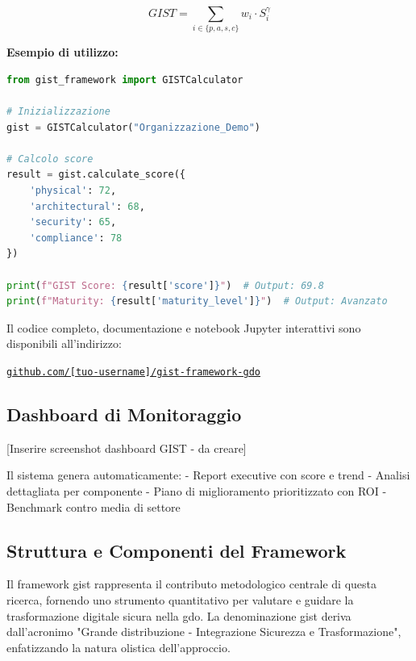 \begin{equation}
GIST = \sum_{i \in \{p,a,s,c\}} w_i \cdot S_i^{\gamma}
\end{equation}

\textbf{Esempio di utilizzo:}
\begin{lstlisting}[language=Python]
from gist_framework import GISTCalculator

# Inizializzazione
gist = GISTCalculator("Organizzazione_Demo")

# Calcolo score
result = gist.calculate_score({
    'physical': 72,
    'architectural': 68,
    'security': 65,
    'compliance': 78
})

print(f"GIST Score: {result['score']}")  # Output: 69.8
print(f"Maturity: {result['maturity_level']}")  # Output: Avanzato
\end{lstlisting}

Il codice completo, documentazione e notebook Jupyter interattivi 
sono disponibili all'indirizzo:

\begin{center}
\large
\href{https://github.com/[tuo-username]/gist-framework-gdo}{\texttt{github.com/[tuo-username]/gist-framework-gdo}}
\end{center}


\subsection{\texorpdfstring{Dashboard di Monitoraggio}{5.3.4 - Dashboard di Monitoraggio}}

[Inserire screenshot dashboard GIST - da creare]

Il sistema genera automaticamente:
- Report executive con score e trend
- Analisi dettagliata per componente
- Piano di miglioramento prioritizzato con ROI
- Benchmark contro media di settore

\subsection{\texorpdfstring{Struttura e Componenti del Framework}{5.3.1 - Struttura e Componenti del Framework}}
\label{subsec:5.3.1}

Il framework \gls{gist} rappresenta il contributo metodologico centrale di questa ricerca, fornendo uno strumento quantitativo per valutare e guidare la trasformazione digitale sicura nella \gls{gdo}. La denominazione \gls{gist} deriva dall'acronimo "Grande distribuzione - Integrazione Sicurezza e Trasformazione", enfatizzando la natura olistica dell'approccio.

